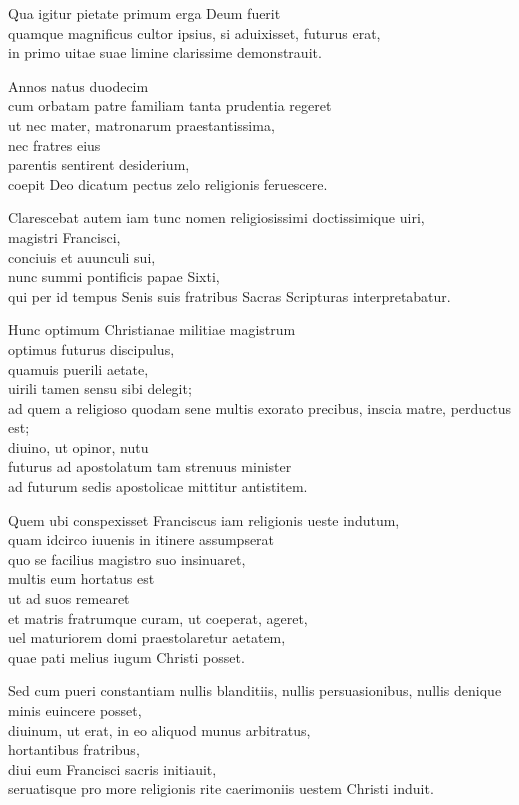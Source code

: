 \documentclass[a5paper,twoside]{article}
\begin{document}
Qua igitur pietate primum erga Deum fuerit \\
quamque magnificus cultor ipsius, si aduixisset, futurus erat, \\
in primo uitae suae limine clarissime demonstrauit. 

Annos natus duodecim \\
cum orbatam patre familiam tanta prudentia regeret \\
ut nec mater, matronarum praestantissima, \\
nec fratres eius \\
parentis sentirent desiderium, \\
coepit Deo dicatum pectus zelo religionis feruescere. 

Clarescebat autem iam tunc nomen religiosissimi doctissimique uiri, \\
magistri Francisci, \\
conciuis et auunculi sui, \\
nunc summi pontificis papae Sixti, \\
qui per id tempus Senis suis fratribus Sacras Scripturas interpretabatur. 

Hunc optimum Christianae militiae magistrum \\
optimus futurus discipulus, \\
quamuis puerili aetate, \\
uirili tamen sensu sibi delegit; \\
ad quem a religioso quodam sene multis exorato precibus, inscia matre, perductus est; \\
diuino, ut opinor, nutu \\
futurus ad apostolatum tam strenuus minister \\
ad futurum sedis apostolicae mittitur antistitem. 

Quem ubi conspexisset Franciscus iam religionis ueste indutum, \\
quam idcirco iuuenis in itinere assumpserat \\
quo se facilius magistro suo insinuaret, \\
multis eum hortatus est \\
ut ad suos remearet \\
et matris fratrumque curam, ut coeperat, ageret, \\
uel maturiorem domi praestolaretur aetatem, \\
quae pati melius iugum Christi posset. 

Sed cum pueri constantiam nullis blanditiis, nullis persuasionibus, nullis denique minis euincere posset, \\
diuinum, ut erat, in eo aliquod munus arbitratus, \\
hortantibus fratribus, \\
diui eum Francisci sacris initiauit, \\
seruatisque pro more religionis rite caerimoniis uestem Christi induit. 
\end{document}
